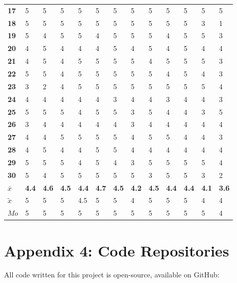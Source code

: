 \documentclass{article}
\begin{document}
\begin{table}[!htb]
\begin{minipage}{1\linewidth}
\begin{tabular}{|*{13}{p{0.5cm}|}}
			\textbf{17} & 5 & 5 & 5 & 5 & 5 & 5 & 5 & 5 & 5 & 5 & 5 & 5 \\
			\textbf{18} & 5 & 5 & 5 & 5 & 5 & 5 & 5 & 5 & 5 & 5 & 3 & 1 \\
			\textbf{19} & 5 & 4 & 5 & 5 & 4 & 5 & 5 & 5 & 4 & 5 & 5 & 3 \\
			\textbf{20} & 4 & 5 & 4 & 4 & 4 & 5 & 4 & 5 & 4 & 5 & 4 & 4 \\
			\textbf{21} & 4 & 5 & 4 & 5 & 5 & 5 & 5 & 4 & 5 & 5 & 5 & 3 \\
			\textbf{22} & 5 & 5 & 4 & 5 & 5 & 5 & 5 & 5 & 4 & 5 & 4 & 3 \\
			\textbf{23} & 3 & 2 & 4 & 5 & 5 & 5 & 5 & 5 & 5 & 5 & 5 & 4 \\
			\textbf{24} & 4 & 4 & 4 & 4 & 4 & 3 & 4 & 4 & 3 & 4 & 4 & 3 \\
			\textbf{25} & 5 & 5 & 5 & 4 & 5 & 5 & 3 & 5 & 4 & 4 & 3 & 5 \\
			\textbf{26} & 3 & 4 & 4 & 4 & 4 & 4 & 3 & 4 & 4 & 4 & 4 & 4 \\
			\textbf{27} & 4 & 4 & 5 & 5 & 5 & 5 & 4 & 5 & 5 & 4 & 4 & 3 \\
			\textbf{28} & 4 & 5 & 4 & 4 & 5 & 5 & 4 & 4 & 4 & 4 & 4 & 4 \\
			\textbf{29} & 5 & 5 & 5 & 4 & 5 & 4 & 3 & 5 & 5 & 5 & 5 & 4 \\
			\textbf{30} & 5 & 4 & 5 & 5 & 5 & 5 & 5 & 3 & 5 & 5 & 3 & 2 \\
			$\bar{x}$ & \textbf{4.4} & \textbf{4.6} & \textbf{4.5} & \textbf{4.4} & \textbf{4.7} & \textbf{4.5} & \textbf{4.2} & \textbf{4.5} & \textbf{4.4} & \textbf{4.4} & \textbf{4.1} & \textbf{3.6} \\
			$\tilde{x}$ & 5 & 5 & 5 & 4.5 & 5 & 5 & 4 & 5 & 5 & 5 & 4 & 4 \\
			$Mo$ & 5 & 5 & 5 & 5 & 5 & 5 & 5 & 5 & 5 & 5 & 5 & 4 \\
			\hline
		\end{tabular}
	\end{minipage}%
\end{table}

\newpage

\section*{Appendix 4: Code Repositories}

All code written for this project is open-source, available on GitHub:
\end{document}

